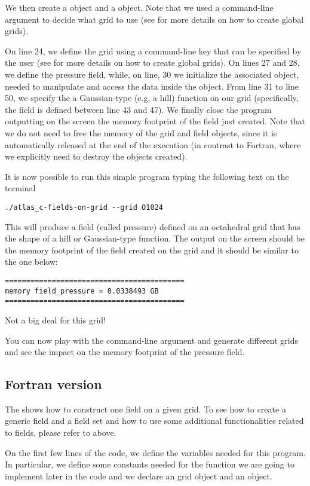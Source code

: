 We then create 
a  object and a  object.
Note that we used a command-line argument to decide 
what grid to use (see  for 
more details on how to create global grids).

On line 24, we define the grid using a command-line key 
that can be specified by the user (see 
for more details on how to create global grids).
On lines 27 and 28, we define the pressure field, while, 
on line, 30 we initialize the associated  
object, needed to manipulate and access the data inside the 
 object.
From line 31 to line 50, we specify the a Gaussian-type 
(e.g. a hill) function on our grid (specifically, the 
field is defined between line 43 and 47).
We finally close the program outputting on the screen 
the memory footprint of the field just created.
Note that we do not need to free the memory of the grid 
and field objects, since it is automatically released 
at the end of the execution (in contrast to Fortran, 
where we explicitly need to destroy the objects created).

It is now possible to run this simple program typing
the following text on the terminal
%
\begin{lstlisting}[style=BashStyle]
./atlas_c-fields-on-grid --grid O1024
\end{lstlisting}
% 
This will produce a field (called pressure) defined 
on an octahedral grid that has the shape of a hill 
or Gaussian-type function.
The output on the screen should be the memory footprint 
of the field created on the grid and it should be similar 
to the one below:
%
\begin{lstlisting}[style=BashStyle]
==========================================
memory field_pressure = 0.0338493 GB
==========================================
\end{lstlisting}
% 
Not a big deal for this grid!

You can now play with the command-line argument and 
generate different grids and see the impact on the 
memory footprint of the pressure field.



\subsection{Fortran version}
The  shows how to construct one field
on a given grid. To see how to create a generic field and 
a field set and how to use some additional functionalities 
related to fields, please refer to 
above. 
%

%
On the first few lines of the code, we define the variables
needed for this program. In particular, we define some constants 
needed for the function we are going to implement later in the 
code and we declare an  grid object and 
an  object.

